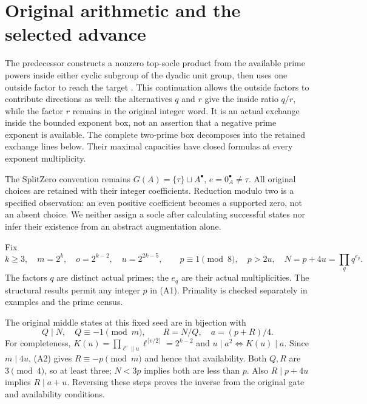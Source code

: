 \section{Original arithmetic and the selected advance}
The predecessor constructs a nonzero top-socle product from the available
prime powers inside either cyclic subgroup of the dyadic unit group, then
uses one outside factor to reach the target \cite[Sections 2--4]{Prior}.
This continuation allows the outside factors to contribute directions as
well: the alternatives $q$ and $r$ give the inside ratio $q/r$, while the
factor $r$ remains in the original integer word. It is an actual exchange
inside the bounded exponent box, not an assertion that a negative prime
exponent is available. The complete two-prime box decomposes into the
retained exchange lines below. Their maximal capacities have closed formulas
at every exponent multiplicity.

The SplitZero convention remains
$G(A)=\{\tau\}\sqcup A^\bullet$, $e=0_A^\bullet\ne\tau$.
All original choices are retained with their integer coefficients. Reduction
modulo two is a specified observation: an even positive coefficient becomes
a supported zero, not an absent choice. We neither assign a socle after
calculating successful states nor infer their existence from an abstract
augmentation alone.

Fix
\[
 k\ge3,\quad m=2^k,\quad o=2^{k-2},\quad u=2^{2k-5},\qquad
 p\equiv1\pmod8,\quad p>2u,\quad N=p+4u=\prod_{q}q^{e_q}. \tag{A1}
\]
The factors $q$ are distinct actual primes; the $e_q$ are their actual
multiplicities. The structural results permit any integer $p$ in (A1).
Primality is checked separately in examples and the prime census.

The original middle states at this fixed seed are in bijection with
\[
 Q\mid N,\quad Q\equiv-1\pmod m,\qquad
 R=N/Q,\quad a=(p+R)/4.                                    \tag{A2}
\]
For completeness, $K(u)=\prod_{\ell^v\parallel u}\ell^{\lceil v/2\rceil}
=2^{k-2}$ and $u\mid a^2\iff K(u)\mid a$. Since $m\mid4u$, (A2) gives
$R\equiv-p\pmod m$ and hence that availability. Both $Q,R$ are $3\pmod4$,
so at least three; $N<3p$ implies both are less than $p$. Also
$R\mid p+4u$ implies $R\mid a+u$. Reversing these steps proves the inverse
from the original gate and availability conditions.

